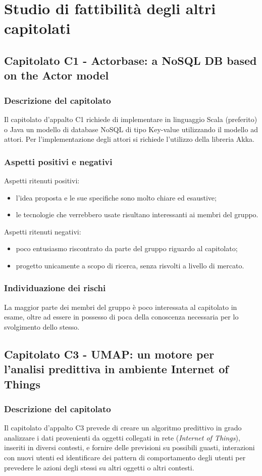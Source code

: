 \documentclass[../StudioDiFattibilita.tex]{subfiles}
\begin{document}
\section{Studio di fattibilità degli altri capitolati}
	\subsection{Capitolato C1 - Actorbase: a NoSQL DB based on the Actor model}
		\subsubsection{Descrizione del capitolato}
		Il capitolato d'appalto C1 richiede di implementare in linguaggio Scala (preferito) o Java un modello di database NoSQL di tipo Key-value utilizzando il modello ad attori. Per l'implementazione degli attori si richiede l'utilizzo della libreria Akka.
		\subsubsection{Aspetti positivi e negativi}
		Aspetti ritenuti positivi:
			\begin{itemize}
				\item l'idea proposta e le sue specifiche sono molto chiare ed esaustive;
				\item le tecnologie che verrebbero usate risultano interessanti ai membri del gruppo.
			\end{itemize}
		Aspetti ritenuti negativi:
			\begin{itemize}
				\item poco entusiasmo riscontrato da parte del gruppo riguardo al capitolato;
				\item progetto unicamente a scopo di ricerca, senza risvolti a livello di mercato.
			\end{itemize}
		\subsubsection{Individuazione dei rischi}
		La maggior parte dei membri del gruppo è poco interessata al capitolato in esame, oltre ad essere in possesso di poca della conoscenza necessaria per lo svolgimento dello stesso.		
	\subsection{Capitolato C3 - UMAP: un motore per l'analisi predittiva in ambiente Internet of Things}
		\subsubsection{Descrizione del capitolato}
		Il capitolato d'appalto C3 prevede di creare un algoritmo predittivo in grado analizzare i dati provenienti da oggetti collegati in rete (\textit{Internet of Things}), inseriti in diversi contesti, e fornire delle previsioni su possibili guasti, interazioni con nuovi utenti ed identificare dei pattern di comportamento degli utenti per prevedere le azioni degli stessi su altri oggetti o altri contesti.
\end{document}
